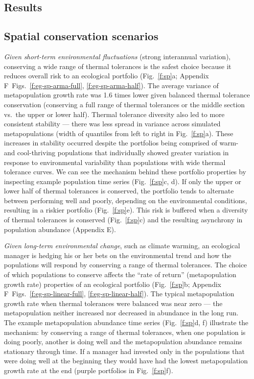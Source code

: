 \documentclass[12pt,english]{article}
\newcommand{\somcor}{Appendix E}
\newcommand{\somts}{Appendix F}
\begin{document}
\begin{spacing}{1.9}
\section{Results}\label{results}

\subsection{Spatial conservation scenarios}\label{spatial-conservation-scenarios}

\emph{Given short-term environmental fluctuations} (strong interannual variation), conserving a wide range of thermal tolerances is the safest choice because it reduces overall risk to an ecological portfolio (Fig.~\ref{f:sp}a; \somts~Figs.~\ref{f:eg-sp-arma-full}, \ref{f:eg-sp-arma-half}). The average variance of metapopulation growth rate was 1.6 times lower given balanced thermal tolerance conservation (conserving a full range of thermal tolerances or the middle section vs.~the upper or lower half). Thermal tolerance diversity also led to more consistent stability --- there was less spread in variance across simulated metapopulations (width of quantiles from left to right in Fig.~\ref{f:sp}a). These increases in stability occurred despite the portfolios being comprised of warm- and cool-thriving populations that individually showed greater variation in response to environmental variability than populations with wide thermal tolerance curves. We can see the mechanism behind these portfolio properties by inspecting example population time series (Fig.~\ref{f:sp}c, d). If only the upper or lower half of thermal tolerances is conserved, the portfolio tends to alternate between performing well and poorly, depending on the environmental conditions, resulting in a riskier portfolio (Fig.~\ref{f:sp}e). This risk is buffered when a diversity of thermal tolerances is conserved (Fig.~\ref{f:sp}c) and the resulting asynchrony in population abundance (\somcor).

\emph{Given long-term environmental change}, such as climate warming, an ecological manager is hedging his or her bets on the environmental trend and how the populations will respond by conserving a range of thermal tolerances. The choice of which populations to conserve affects the ``rate of return'' (metapopulation growth rate) properties of an ecological portfolio (Fig.~\ref{f:sp}b; \somts~Figs.~\ref{f:eg-sp-linear-full}, \ref{f:eg-sp-linear-half}). The typical metapopulation growth rate when thermal tolerances were balanced was near zero --- the metapopulation neither increased nor decreased in abundance in the long run. The example metapopulation abundance time series (Fig.~\ref{f:sp}d, f) illustrate the mechanism: by conserving a range of thermal tolerances, when one population is doing poorly, another is doing well and the metapopulation abundance remains stationary through time. If a manager had invested only in the populations that were doing well at the beginning they would have had the lowest metapopulation growth rate at the end (purple portfolios in Fig.~\ref{f:sp}f).


\end{spacing}
\end{document}
